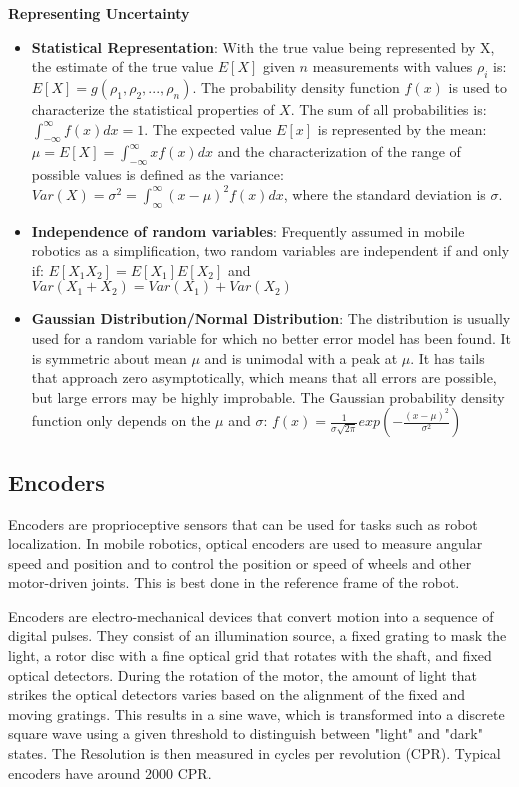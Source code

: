 \begin{itemize}
\textbf{Representing Uncertainty}
\begin{itemize}
    \item \textbf{Statistical Representation}:
    With the true value being represented by X, the estimate of the true value  $E[X]$ given $n$ measurements with values $\rho_i$ is: $E[X]=g(\rho_1,\rho_2,...,\rho_n)$.
    The probability density function $f(x)$ is used to characterize the statistical properties of $X$. The sum of all probabilities is: $\int_{-\infty}^{\infty}f(x)dx=1$.
    The expected value $E[x]$ is represented by the mean: $\mu=E[X]=\int_{-\infty}^{\infty}xf(x)dx$ and the characterization of the range of possible values is defined as the variance: $Var(X)=\sigma^2=\int_{\infty}^{\infty}(x-\mu)^2f(x)dx$, where the standard deviation is $\sigma$.
    \item \textbf{Independence of random variables}:
    Frequently assumed in mobile robotics as a simplification, two random variables are independent if and only if: $E[X_1X_2]=E[X_1]E[X_2]$ and $Var(X_1+X_2)=Var(X_1)+Var(X_2)$
    \item \textbf{Gaussian Distribution/Normal Distribution}:
    The distribution is usually used for a random variable for which no better error model has been found. It is symmetric about mean $\mu$ and is unimodal with a peak at $\mu$. It has tails that approach zero asymptotically, which means that all errors are possible, but large errors may be highly improbable. The Gaussian probability density function only depends on the $\mu$ and $\sigma$: $f(x)=\frac{1}{\sigma\sqrt{2\pi}}exp\left(-\frac{\left(x-\mu\right)^2}{\sigma^2}\right)$

\end{itemize}
\subsection{Encoders}
Encoders are proprioceptive sensors that can be used for tasks such as robot localization. In mobile robotics, optical encoders are used to measure angular speed and position and to control the position or speed of wheels and other motor-driven joints. This is best done in the reference frame of the robot.

Encoders are electro-mechanical devices that convert motion into a sequence of digital pulses. They consist of an illumination source, a fixed grating to mask the light, a rotor disc with a fine optical grid that rotates with the shaft, and fixed optical detectors. During the rotation of the motor, the amount of light that strikes the optical detectors varies based on the alignment of the fixed and moving gratings. This results in a sine wave, which is transformed into a discrete square wave using a given threshold to distinguish between "light" and "dark" states. The Resolution is then measured in cycles per revolution (CPR). Typical encoders have around 2000 CPR.


\end{itemize}
